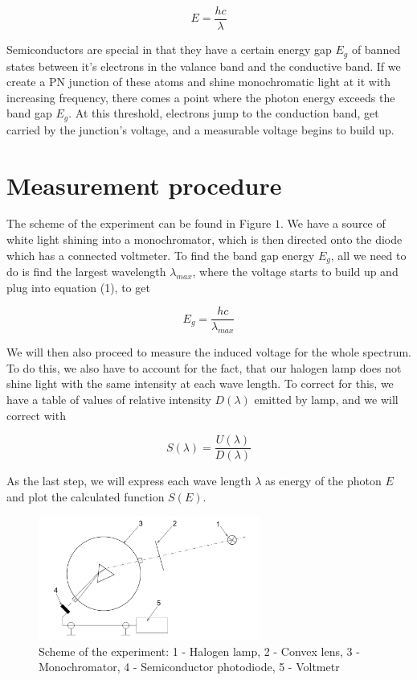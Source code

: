 \documentclass[a4paper,11pt]{article}
\begin{document}
\begin{equation}
    E = \frac{h c}{\lambda}
\end{equation}

Semiconductors are special in that they have a certain energy gap $ E_g $ of banned states between it's electrons in the valance band and the conductive band. If we create a PN junction of these atoms and shine monochromatic light at it with increasing frequency, there comes a point where the photon energy exceeds the band gap $ E_g $. At this threshold, electrons jump to the conduction band, get carried by the junction's voltage, and a measurable voltage begins to build up.
 
\section{Measurement procedure}

The scheme of the experiment can be found in Figure $ 1 $. We have a source of white light shining into a monochromator, which is then directed onto the diode which has a connected voltmeter. To find the band gap energy $ E_g $, all we need to do is find the largest wavelength $ \lambda_{max} $, where the voltage starts to build up and plug into equation (1), to get

\begin{equation}
E_{g} = \frac{h c}{\lambda_{max}}
\end{equation}

\vspace{10pt}

We will then also proceed to measure the induced voltage for the whole spectrum. To do this, we also have to account for the fact, that our halogen lamp does not shine light with the same intensity at each wave length. To correct for this, we have a table of values of relative intensity $ D(\lambda) $  emitted by lamp, and we will correct with

\begin{equation}
 S(\lambda) = \frac{U(\lambda)}{ D(\lambda) }
\end{equation}

As the last step, we will express each wave length $ \lambda $ as energy of the photon $ E $ and plot the calculated function $ S(E) $.



\begin{figure}[htpb]
    \centering
    \includegraphics[width=0.65\textwidth]{aparatura.jpg}
    \caption{Scheme of the experiment: 1 - Halogen lamp, 2 - Convex lens, 3 - Monochromator, 4 - Semiconductor photodiode, 5 - Voltmetr}
\end{figure}
\end{document}
